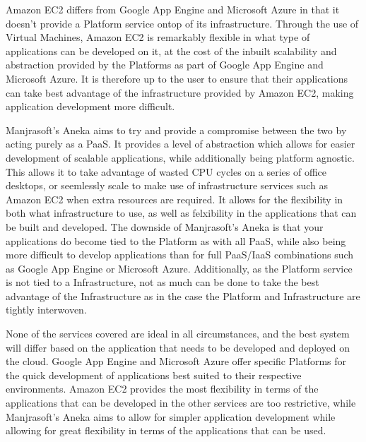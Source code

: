 Amazon EC2 differs from Google App Engine and Microsoft Azure in that it doesn't provide a Platform service ontop of its infrastructure. Through the use of Virtual Machines, Amazon EC2 is remarkably flexible in what type of applications can be developed on it, at the cost of the inbuilt scalability and abstraction provided by the Platforms as part of Google App Engine and Microsoft Azure. It is therefore up to the user to ensure that their applications can take best advantage of the infrastructure provided by Amazon EC2, making application development more difficult.

Manjrasoft's Aneka aims to try and provide a compromise between the two by acting purely as a PaaS. It provides a level of abstraction which allows for easier development of scalable applications, while additionally being platform agnostic. This allows it to take advantage of wasted CPU cycles on a series of office desktops, or seemlessly scale to make use of infrastructure services such as Amazon EC2 when extra resources are required. It allows for the flexibility in both what infrastructure to use, as well as felxibility in the applications that can be built and developed. The downside of Manjrasoft's Aneka is that your applications do become tied to the Platform as with all PaaS, while also being more difficult to develop applications than for full PaaS/IaaS combinations such as Google App Engine or Microsoft Azure. Additionally, as the Platform service is not tied to a Infrastructure, not as much can be done to take the best advantage of the Infrastructure as in the case the Platform and Infrastructure are tightly interwoven. 

None of the services covered are ideal in all circumstances, and the best system will differ based on the application that needs to be developed and deployed on the cloud. Google App Engine and Microsoft Azure offer specific Platforms for the quick development of applications best suited to their respective environments. Amazon EC2 provides the most flexibility in terms of the applications that can be developed in the other services are too restrictive, while Manjrasoft's Aneka aims to allow for simpler application development while allowing for great flexibility in terms of the applications that can be used.
